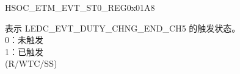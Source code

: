 \addtocounter{Regfloat}{-1}
\begin{register}{H}{SOC\_ETM\_EVT\_ST0\_REG}{0x01A8}
\begin{regdesc}\begin{reglist}
\item [接上页...]

\label{fielddesc:SOCETMLEDCEVTDUTYCHNGENDCH5ST}\item [SOC\_ETM\_LEDC\_EVT\_DUTY\_CHNG\_END\_CH5\_ST] 表示 LEDC\_EVT\_DUTY\_CHNG\_END\_CH5 的触发状态。\\0：未触发\\1：已触发\\ (R/WTC/SS)
\end{reglist}\end{regdesc}
\end{register}


